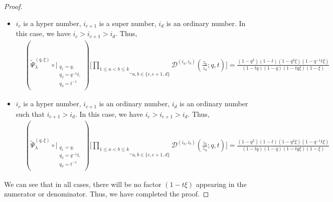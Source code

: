 \documentclass[12pt,reqno,a4paper]{amsart}
\newcommand{\comp}{\circ}
\newcommand{\cals}[1]{\mathcal{#1}}
\numberwithin{equation}{section}
\newcommand{\dualmap}{
\widetilde{\Psi}^{(q,\xi)}_{\lambda}
}
\theoremstyle{definition}
\begin{document}
\begin{proof}
\begin{itemize}
\begin{align}
{{				q_3 = t^{-1} \\
			}
		}
		)
		\Bigg[
		\underbrace{	\prod_{1 \leq a < b \leq k}				}_{a,b \in \{c,c+1,d\}}
		\cals{D}^{(i_a,i_b)}\left(
		\frac{z_b}{z_a}
		; q, t
		\right)
		\Bigg]
		= 
		\frac{
			(1 - q^2)(1 - t)(1 - q^2\xi)(1 - q^{-1}t\xi)
		}{
			(1 - tq)(1 - q)(1 - tq\xi)(1 - \xi)
		}
	\end{align}
	\normalsize
	\item $i_c$ is a hyper number, $i_{c+1}$ is a super number, $i_d$ is an ordinary number. In this case, we have 
	$i_c > i_{c+1} > i_d$. Thus, 
	\footnotesize
	\begin{align}
		&(
		\dualmap
		\comp 
		\bigg|_{
			\substack{
				q_1 = q, \\
				q_2 = q^{-1}t,\\
				q_3 = t^{-1} \\
			}
		}
		)
		\Bigg[
		\underbrace{	\prod_{1 \leq a < b \leq k}				}_{a,b \in \{c,c+1,d\}}
		\cals{D}^{(i_a,i_b)}\left(
		\frac{z_b}{z_a}
		; q, t
		\right)
		\Bigg]
		= 
		\frac{
			(1 - q^2)(1 - t)(1 - q^2\xi)(1 - q^{-1}t\xi)
		}{
			(1 - tq)(1 - q)(1 - tq\xi)(1 - \xi)
		}
	\end{align}
	\normalsize
	\item $i_c$ is a hyper number, $i_{c+1}$ is an ordinary number, $i_d$ is an ordinary number such that $i_{c+1} > i_d$. In this case, we have $i_c > i_{c+1} > i_d$. Thus, 
	\footnotesize
	\begin{align}
		&(
		\dualmap
		\comp 
		\bigg|_{
			\substack{
				q_1 = q, \\
				q_2 = q^{-1}t,\\
				q_3 = t^{-1} \\
			}
		}
		)
		\Bigg[
		\underbrace{	\prod_{1 \leq a < b \leq k}				}_{a,b \in \{c,c+1,d\}}
		\cals{D}^{(i_a,i_b)}\left(
		\frac{z_b}{z_a}
		; q, t
		\right)
		\Bigg]
		= 
		\frac{
			(1 - q^2)(1 - t)(1 - q^2\xi)(1 - q^{-1}t\xi)
		}{
			(1 - tq)(1 - q)(1 - tq\xi)(1 - \xi)
		}
	\end{align}
	\normalsize
\end{itemize}
We can see that in all cases, there will be no factor $(1 - t\xi)$ appearing in the numerator or denominator. Thus, we have completed the proof. 
\end{proof}
\end{document}
